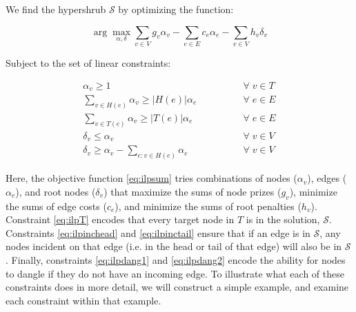 \documentclass[12pt,twoside]{reedthesis}
\theoremstyle{definition}
\newcommand{\argmax}{\arg\!\max}
\begin{document}
We find the hypershrub $\mathcal{S}$ by optimizing the function:

\begin{equation} \label{eq:ilpsum}
 \argmax_{\alpha, \delta} \sum_{v \in V} g_v \alpha_v - \sum_{e \in E} c_e \alpha_e - \sum_{v \in V} h_v \delta_v
\end{equation}

Subject to the set of linear constraints:

\begin{align}
 \alpha_v \geq 1 \qquad\qquad &\forall\; v \in T\label{eq:ilpT}\\
 \sum_{v \in H(e)} \alpha_v \geq \lvert H(e)\rvert \alpha_e \qquad\qquad &\forall\; e \in E\label{eq:ilpinchead}\\
 \sum_{v \in T(e)} \alpha_v \geq \lvert T(e)\rvert \alpha_e\qquad\qquad &\forall\; e \in E\label{eq:ilpinctail}\\
 \delta_v \leq \alpha_v \qquad\qquad &\forall\; v \in V\label{eq:ilpdang1}\\
 \delta_v \geq \alpha_{v} - \sum_{e:v \in H(e)} \alpha_e \qquad\qquad &\forall\; v \in V\label{eq:ilpdang2}%
\end{align}%


Here, the objective function \eqref{eq:ilpsum} tries combinations of nodes ($\alpha_v$), edges ($\alpha_e$), and root nodes ($\delta_v$) that maximize the sums of node prizes ($g_v$), minimize the sums of edge costs ($c_e$), and minimize the sums of root penalties ($h_v$). Constraint \eqref{eq:ilpT} encodes that every target node in $T$ is in the solution, $\mathcal{S}$.  Constraints \eqref{eq:ilpinchead} and \eqref{eq:ilpinctail} ensure that if an edge is in $\mathcal{S}$, any nodes incident on that edge (i.e. in the head or tail of that edge) will also be in $\mathcal{S}$.  Finally, constraints \eqref{eq:ilpdang1} and \eqref{eq:ilpdang2} encode the ability for nodes to dangle if they do not have an incoming edge. To illustrate what each of these constraints does in more detail, we will construct a simple example, and examine each constraint within that example.\par
\end{document}

